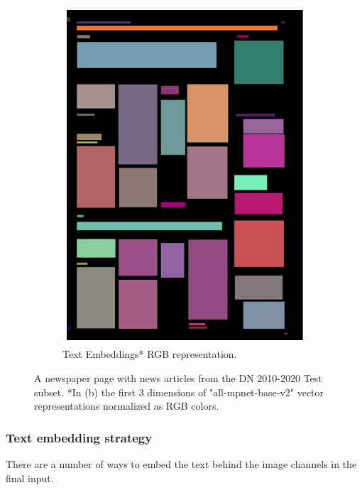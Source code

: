 \documentclass[oneside, english, bibtex]{kththesis}
\begin{document}
\begin{figure}[!htb]
\begin{adjustbox}{center,max size={\textwidth}{0.9\textheight}}
{\begin{subfigure}{0.75\textwidth}
  \includegraphics[width=\linewidth, clip=true, trim = 0mm 0mm 0mm 0mm]{figures/tf/AVThDFz.jpg}
  \caption{Text Embeddings* RGB representation.}
  \label{fig:AVThDFz_tf}
\end{subfigure}}
\end{adjustbox}
  \caption{A newspaper page with news articles from the DN 2010-2020 Test subset. *In (b) the first 3 dimensions of "all-mpnet-base-v2" vector representations normalized as RGB colors.}
\label{fig:AVThDFz_tf_comp}
\end{figure}

\clearpage

\subsubsection{Text embedding strategy}
\label{subs:textembeddingstrat}
There are a number of ways to embed the text behind the image channels in the final input.
\end{document}
